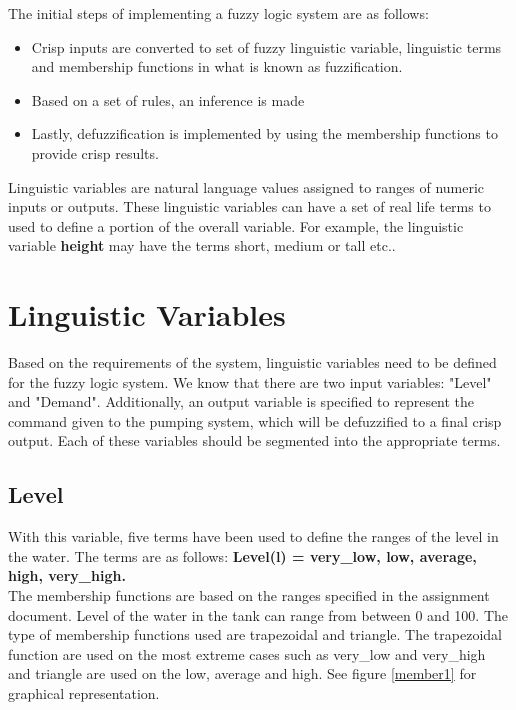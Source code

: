 

The initial steps of implementing a fuzzy logic system are as follows:
\begin{itemize}
	\item Crisp inputs are converted to set of fuzzy linguistic variable, linguistic terms and membership functions in what is known as fuzzification. 
	\item Based on a set of rules, an inference is made
	\item Lastly, defuzzification is implemented by using the membership functions to provide crisp results.
\end{itemize}
Linguistic variables are natural language values assigned to ranges of numeric inputs or outputs. These linguistic variables can have a set of real life terms to used to define a portion of the overall variable. For example, the linguistic variable \textbf{height} may have the terms {short, medium or tall etc.}. 

\section*{Linguistic Variables}
Based on the requirements of the system, linguistic variables need to be defined for the fuzzy logic system. We know that there are two input variables: "Level" and "Demand". Additionally, an output variable is specified to represent the command given to the pumping system, which will be defuzzified to a final crisp output. Each of these variables should be segmented into the appropriate terms. 
\subsection*{Level}
With this variable, five terms have been used to define the ranges of the level in the water. The terms are as follows: 
\textbf{Level(l) = {very\_low, low, average, high, very\_high}.}\\
The membership functions are based on the ranges specified in the assignment document. Level of the water in the tank can range from between 0 and 100. The type of membership functions used are trapezoidal and triangle. The trapezoidal function are used on the most extreme cases such as very\_low and very\_high and triangle are used on the low, average and high. See figure \ref{member1} for graphical representation.

